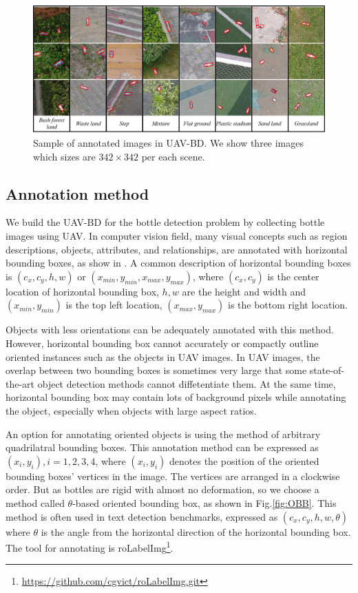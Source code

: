 \begin{figure}
	\includegraphics[width=\linewidth]{images/UAV-BD2.png}
	\caption{Sample of annotated images in UAV-BD. We show three images which sizes are $ 342\times 342 $ per each scene.}
	\label{fig:dataset-cut-image}
\end{figure}


\subsection{Annotation method}
\label{ssec:annotation_method}

We build the UAV-BD for the bottle detection problem by collecting bottle images using UAV. In computer vision field, many visual concepts such as region descriptions, objects, attributes, and relationships, are annotated with horizontal bounding boxes, as show in \cite{DOTA, boundingbox}. A common description of horizontal bounding boxes is $(c_x, c_y, h, w)$ or $ (x_{min}, y_{min}, x_{max}, y_{max}) $, where $(c_x, c_y)$ is the center location of horizontal bounding box, $h, w$ are the height and width and $ (x_{min}, y_{min}) $ is the top left location, $ (x_{max}, y_{max}) $ is the bottom right location\cite{DOTA}. 

Objects with less orientations can be adequately annotated with this method. However, horizontal bounding box cannot accurately or compactly outline oriented instances such as the objects in UAV images. In UAV images, the overlap between two bounding boxes is sometimes very large that some state-of-the-art object detection methods cannot diffetentiate them\cite{DOTA}. At the same time, horizontal bounding box may contain lots of background pixels while annotating the object, especially when objects with large aspect ratios. 

An option for annotating oriented objects is using the method of arbitrary quadrilatral bounding boxes. This annotation method can be expressed as ${(x_i, y_i), i=1,2,3,4}$, where $(x_i, y_i)$ denotes the position of the oriented bounding boxes' vertices in the image\cite{DOTA}. The vertices are arranged in a clockwise order. But as bottles are rigid with almost no deformation, so we choose a method called $\theta$-based oriented bounding box, as shown in Fig.\ref{fig:OBB}. This method is often used in text detection benchmarks, expressed as $(c_x, c_y, h, w, \theta)$ where $\theta$ is the angle from the horizontal direction of the horizontal bounding box\cite{DOTA}. The tool for annotating is roLabelImg\footnote{\url{https://github.com/cgvict/roLabelImg.git}}.

